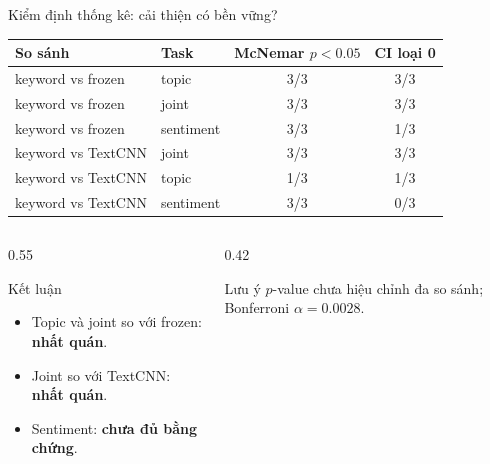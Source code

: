 \documentclass[aspectratio=169,11pt]{beamer}
\newcommand{\good}[1]{\textcolor{sgublue}{\textbf{#1}}}
\newcommand{\bad}[1]{\textcolor{red!70!black}{\textbf{#1}}}
\begin{document}
\begin{frame}{Kiểm định thống kê: cải thiện có bền vững?}
\small
\begin{center}
\begin{tabular}{@{}llcc@{}}
\toprule
So sánh & Task & McNemar $p<0.05$ & CI loại 0 \\
\midrule
keyword vs frozen & topic & 3/3 & 3/3 \\
keyword vs frozen & joint & 3/3 & 3/3 \\
keyword vs frozen & sentiment & 3/3 & 1/3 \\
keyword vs TextCNN & joint & 3/3 & 3/3 \\
keyword vs TextCNN & topic & 1/3 & 1/3 \\
keyword vs TextCNN & sentiment & 3/3 & 0/3 \\
\bottomrule
\end{tabular}
\end{center}

\vspace{0.2cm}
\begin{columns}[T]
\begin{column}{0.55\textwidth}
\begin{block}{Kết luận}
\begin{itemize}
  \item Topic và joint so với frozen: \good{nhất quán}.
  \item Joint so với TextCNN: \good{nhất quán}.
  \item Sentiment: \bad{chưa đủ bằng chứng}.
\end{itemize}
\end{block}
\end{column}
\begin{column}{0.42\textwidth}
\begin{alertblock}{Lưu ý}
$p$-value chưa hiệu chỉnh đa so sánh; Bonferroni $\alpha=0.0028$.
\end{alertblock}
\end{column}
\end{columns}
\end{frame}
\end{document}
